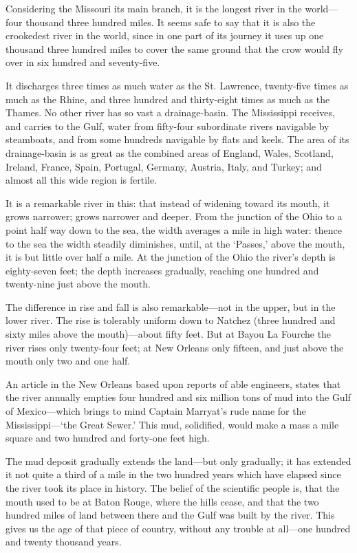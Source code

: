 \documentclass[../../../demo.tex]{novelettesubdoc}
\begin{document}

Considering the Missouri its main branch, it is the longest river in the
world---four thousand three hundred miles. It seems safe to say that it is
also the crookedest river in the world, since in one part of its journey
it uses up one thousand three hundred miles to cover the same ground that the
crow would fly over in six hundred and seventy-five.

It discharges three times as much water as the St. Lawrence, twenty-five times
as much as the Rhine, and three hundred and thirty-eight times as much as the
Thames. No other river has so vast a drainage-basin. The
Mississippi receives, and carries to the Gulf, water from
fifty-four subordinate rivers navigable by steamboats,
and from some hundreds navigable by flats and keels.
The area of its drainage-basin is as great as the combined areas of England,
Wales, Scotland, Ireland, France, Spain, Portugal, Germany, Austria, Italy,
and Turkey; and almost all this wide region is fertile.

It is a remarkable river in this: that instead of widening toward its
mouth, it grows narrower; grows narrower and deeper. From the junction
of the Ohio to a point half way down to the sea, the width averages a
mile in high water: thence to the sea the width steadily diminishes,
until, at the `Passes,' above the mouth, it is but little over half
a mile. At the junction of the Ohio the river's depth is
eighty-seven feet; the depth increases gradually, reaching one hundred
and twenty-nine just above the mouth.

The difference in rise and fall is also remarkable---not in the upper,
but in the lower river. The rise is tolerably uniform down to Natchez
(three hundred and sixty miles above the mouth)---about fifty feet.
But at Bayou La Fourche the river rises only twenty-four feet; at New
Orleans only fifteen, and just above the mouth only two and one half.

An article in the New Orleans   based upon reports of
able engineers, states that the river annually empties four hundred and
six million tons of mud into the Gulf of Mexico---which brings to mind
Captain Marryat's rude name for the Mississippi---`the Great Sewer.' This
mud, solidified, would make a mass a mile square and two hundred and
forty-one feet high.

The mud deposit gradually extends the land---but only gradually; it has
extended it not quite a third of a mile in the two hundred years which
have elapsed since the river took its place in history. The belief of
the scientific people is, that the mouth used to be at Baton Rouge,
where the hills cease, and that the two hundred miles of land between
there and the Gulf was built by the river. This gives us the age of that
piece of country, without any trouble at all---one hundred and twenty
thousand years.
\end{document}
